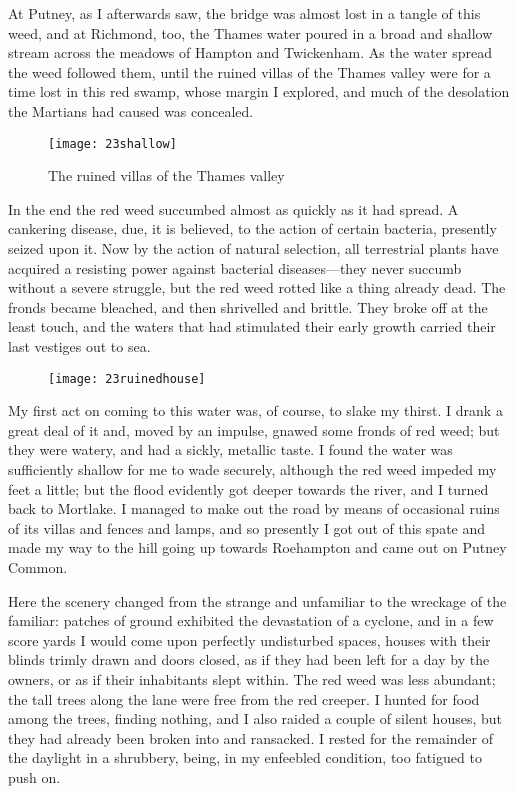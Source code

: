 At Putney, as I afterwards saw, the bridge was almost lost in a tangle of this weed, and at Richmond, too, the Thames water poured in a broad and shallow stream across the meadows of Hampton and Twickenham. As the water spread the weed followed them, until the ruined villas of the Thames valley were for a time lost in this red swamp, whose margin I explored, and much of the desolation the Martians had caused was concealed.

\begin{figure}[tbp]
\centering
\texttt{[image: 23shallow]}
\caption{The ruined villas of the Thames valley}
\end{figure}

In the end the red weed succumbed almost as quickly as it had spread. A cankering disease, due, it is believed, to the action of certain bacteria, presently seized upon it. Now by the action of natural selection, all terrestrial plants have acquired a resisting power against bacterial diseases—they never succumb without a severe struggle, but the red weed rotted like a thing already dead. The fronds became bleached, and then shrivelled and brittle. They broke off at the least touch, and the waters that had stimulated their early growth carried their last vestiges out to sea.

\begin{figure}[tb]
\centering
\texttt{[image: 23ruinedhouse]}
\end{figure}

My first act on coming to this water was, of course, to slake my thirst. I drank a great deal of it and, moved by an impulse, gnawed some fronds of red weed; but they were watery, and had a sickly, metallic taste. I found the water was sufficiently shallow for me to wade securely, although the red weed impeded my feet a little; but the flood evidently got deeper towards the river, and I turned back to Mortlake. I managed to make out the road by means of occasional ruins of its villas and fences and lamps, and so presently I got out of this spate and made my way to the hill going up towards Roehampton and came out on Putney Common.



Here the scenery changed from the strange and unfamiliar to the wreckage of the familiar: patches of ground exhibited the devastation of a cyclone, and in a few score yards I would come upon perfectly undisturbed spaces, houses with their blinds trimly drawn and doors closed, as if they had been left for a day by the owners, or as if their inhabitants slept within. The red weed was less abundant; the tall trees along the lane were free from the red creeper. I hunted for food among the trees, finding nothing, and I also raided a couple of silent houses, but they had already been broken into and ransacked. I rested for the remainder of the daylight in a shrubbery, being, in my enfeebled condition, too fatigued to push on.



